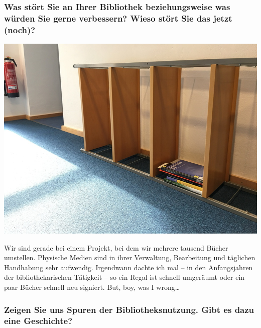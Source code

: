 \hypertarget{was-stuxf6rt-sie-an-ihrer-bibliothek-beziehungsweise-was-wuxfcrden-sie-gerne-verbessern-wieso-stuxf6rt-sie-das-jetzt-noch}{%
\subsubsection*{Was stört Sie an Ihrer Bibliothek beziehungsweise was würden
Sie gerne verbessern? Wieso stört Sie das jetzt
(noch)?}\label{was-stuxf6rt-sie-an-ihrer-bibliothek-beziehungsweise-was-wuxfcrden-sie-gerne-verbessern-wieso-stuxf6rt-sie-das-jetzt-noch}}

\begin{center}
\includegraphics{igb/img/regal.jpg}
\end{center}

Wir sind gerade bei einem Projekt, bei dem wir mehrere tausend Bücher
umstellen. Physische Medien sind in ihrer Verwaltung, Bearbeitung und
täglichen Handhabung sehr aufwendig. Irgendwann dachte ich mal -- in den
Anfangsjahren der bibliothekarischen Tätigkeit -- so ein Regal ist
schnell umgeräumt oder ein paar Bücher schnell neu signiert. But, boy,
was I wrong\ldots{}

\hypertarget{zeigen-sie-uns-spuren-der-bibliotheksnutzung.-gibt-es-dazu-eine-geschichte}{%
\subsubsection*{Zeigen Sie uns Spuren der Bibliotheksnutzung. Gibt es dazu eine
Geschichte?}\label{zeigen-sie-uns-spuren-der-bibliotheksnutzung.-gibt-es-dazu-eine-geschichte}}

